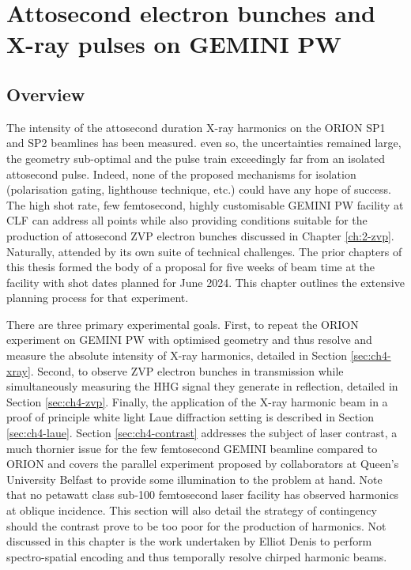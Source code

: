 \chapter{\label{ch:4-gemini}Attosecond electron bunches and X-ray pulses on GEMINI PW} 

\minitoc

\section{Overview}
The intensity of the attosecond duration X-ray harmonics on the ORION SP1 and SP2 beamlines has been measured. even so, the uncertainties remained large, the geometry sub-optimal and the pulse train exceedingly far from an isolated attosecond pulse. Indeed, none of the proposed mechanisms for isolation (polarisation gating, lighthouse technique, etc.) could have any hope of success. The high shot rate, few femtosecond, highly customisable GEMINI PW facility at CLF can address all points while also providing conditions suitable for the production of attosecond ZVP electron bunches discussed in Chapter \ref{ch:2-zvp}. Naturally, attended by its own suite of technical challenges. The prior chapters of this thesis formed the body of a proposal for five weeks of beam time at the facility with shot dates planned for June 2024. This chapter outlines the extensive planning process for that experiment.

There are three primary experimental goals. First, to repeat the ORION experiment on GEMINI PW with optimised geometry and thus resolve and measure the absolute intensity of X-ray harmonics, detailed in Section \ref{sec:ch4-xray}. Second, to observe ZVP electron bunches in transmission while simultaneously measuring the HHG signal they generate in reflection, detailed in Section \ref{sec:ch4-zvp}. Finally, the application of the X-ray harmonic beam in a proof of principle white light Laue diffraction setting is described in Section \ref{sec:ch4-laue}. Section \ref{sec:ch4-contrast} addresses the subject of laser contrast, a much thornier issue for the few femtosecond GEMINI beamline compared to ORION and covers the parallel experiment proposed by collaborators at Queen's University Belfast to provide some illumination to the problem at hand. Note that no petawatt class sub-100 femtosecond laser facility has observed harmonics at oblique incidence. This section will also detail the strategy of contingency should the contrast prove to be too poor for the production of harmonics. Not discussed in this chapter is the work undertaken by Elliot Denis to perform spectro-spatial encoding and thus temporally resolve chirped harmonic beams.

